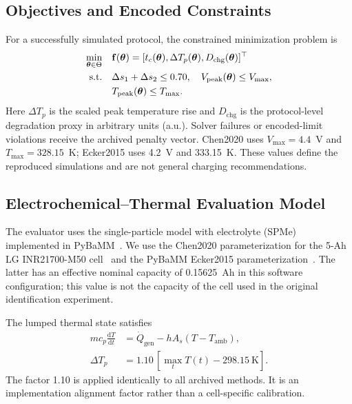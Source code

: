 \subsection{Objectives and Encoded Constraints}

For a successfully simulated protocol, the constrained minimization problem is
\begin{equation}
\begin{aligned}
\min_{\boldsymbol{\theta}\in\Theta}\quad&
\mathbf f(\boldsymbol{\theta})=
[t_c(\boldsymbol{\theta}),\Delta T_p(\boldsymbol{\theta}),D_{\mathrm{chg}}(\boldsymbol{\theta})]^\top\\
\mathrm{s.t.}\quad&
\Delta s_1+\Delta s_2\leq0.70,\quad
V_{\mathrm{peak}}(\boldsymbol{\theta})\leq V_{\max},\\
&T_{\mathrm{peak}}(\boldsymbol{\theta})\leq T_{\max}.
\end{aligned}
\label{eq:cmop}
\end{equation}
Here $\Delta T_p$ is the scaled peak temperature rise and
$D_{\mathrm{chg}}$ is the protocol-level degradation proxy in arbitrary units
(a.u.). Solver failures or encoded-limit violations receive the archived
penalty vector. Chen2020 uses $V_{\max}=4.4$~V and
$T_{\max}=328.15$~K; Ecker2015 uses 4.2~V and 333.15~K. These values define the
reproduced simulations and are not general charging recommendations.

\subsection{Electrochemical--Thermal Evaluation Model}
\label{sec:model}

The evaluator uses the single-particle model with electrolyte (SPMe)
~\cite{ref11} implemented in PyBaMM~\cite{ref12}. We use the Chen2020
parameterization for the 5-Ah LG INR21700-M50 cell~\cite{ref13} and the
PyBaMM Ecker2015 parameterization~\cite{ref14}. The latter has an effective
nominal capacity of 0.15625~Ah in this software configuration; this value is
not the capacity of the cell used in the original identification experiment.

The lumped thermal state satisfies~\cite{ref22}
\begin{equation}
\begin{aligned}
m c_p\frac{\mathrm dT}{\mathrm dt}
&=\dot Q_{\mathrm{gen}}-hA_s(T-T_{\mathrm{amb}}),\\
\Delta T_p&=1.10\,[\max_tT(t)-298.15~\mathrm{K}].
\end{aligned}
\label{eq:thermal}
\end{equation}
The factor 1.10 is applied identically to all archived methods. It is an
implementation alignment factor rather than a cell-specific calibration.


